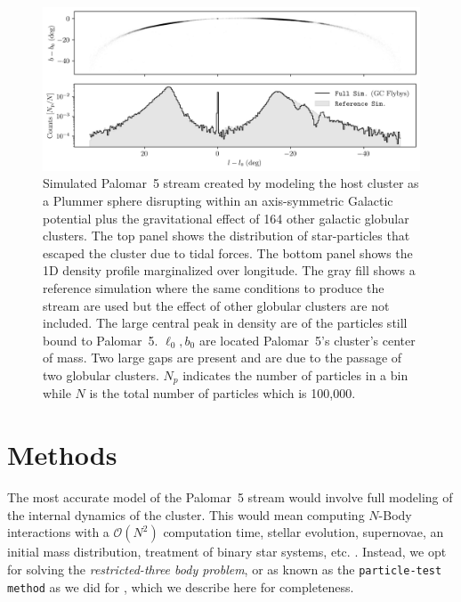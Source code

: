 \documentclass[draft]{aa}
\begin{document}
  \begin{figure}
    \centering
    \includegraphics[width=\linewidth]{stream_on_sky_Pal5_monte-carlo-009_pouliasis2017pii-GCNBody_pouliasis2017pii.png}
    \caption{Simulated Palomar~5 stream created by modeling the host cluster as a Plummer sphere disrupting within an axis-symmetric Galactic potential plus the gravitational effect of 164 other galactic globular clusters. The top panel shows the distribution of star-particles that escaped the cluster due to tidal forces. The bottom panel shows the 1D density profile marginalized over longitude. The gray fill shows a reference simulation where the same conditions to produce the stream are used but the effect of other globular clusters are not included. The large central peak in density are of the particles still bound to Palomar~5. $\ell_0,b_0$ are located Palomar~5's cluster's center of mass. Two large gaps are present and are due to the passage of two globular clusters. $N_p$ indicates the number of particles in a bin while $N$ is the total number of particles which is 100,000.}
    \label{fig:stream_on_sky}
    \end{figure}


\section{Methods}
  The most accurate model of the Palomar~5 stream would involve full modeling of the internal dynamics of the cluster. This would mean computing $N$-Body interactions with a $\mathcal{O}(N^2)$ computation time, stellar evolution, supernovae, an initial mass distribution, treatment of binary star systems, etc. \citep[for such an example, see][]{2021NatAs...5..957G, 2016MNRAS.458.1450W}. Instead, we opt for solving the \textit{restricted-three body problem}, or as known as the \texttt{particle-test method} as we did for \citet{2023A&A...673A..44F}, which we describe here for completeness. 
\end{document}
